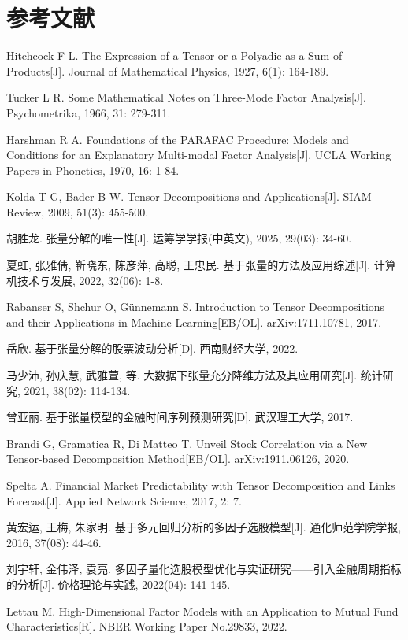 \chapter*{参考文献}
\begin{enumerate}[label={[\arabic*]}]
  \item Hitchcock F L. The Expression of a Tensor or a Polyadic as a Sum of Products[J]. Journal of Mathematical Physics, 1927, 6(1): 164-189.
  \item Tucker L R. Some Mathematical Notes on Three-Mode Factor Analysis[J]. Psychometrika, 1966, 31: 279-311.
  \item Harshman R A. Foundations of the PARAFAC Procedure: Models and Conditions for an Explanatory Multi-modal Factor Analysis[J]. UCLA Working Papers in Phonetics, 1970, 16: 1-84.
  \item Kolda T G, Bader B W. Tensor Decompositions and Applications[J]. SIAM Review, 2009, 51(3): 455-500.
  \item 胡胜龙. 张量分解的唯一性[J]. 运筹学学报(中英文), 2025, 29(03): 34-60.
  \item 夏虹, 张雅倩, 靳晓东, 陈彦萍, 高聪, 王忠民. 基于张量的方法及应用综述[J]. 计算机技术与发展, 2022, 32(06): 1-8.
  \item Rabanser S, Shchur O, Günnemann S. Introduction to Tensor Decompositions and their Applications in Machine Learning[EB/OL]. arXiv:1711.10781, 2017.
  \item 岳欣. 基于张量分解的股票波动分析[D]. 西南财经大学, 2022.
  \item 马少沛, 孙庆慧, 武雅萱, 等. 大数据下张量充分降维方法及其应用研究[J]. 统计研究, 2021, 38(02): 114-134.
  \item 曾亚丽. 基于张量模型的金融时间序列预测研究[D]. 武汉理工大学, 2017.
  \item Brandi G, Gramatica R, Di Matteo T. Unveil Stock Correlation via a New Tensor-based Decomposition Method[EB/OL]. arXiv:1911.06126, 2020.
  \item Spelta A. Financial Market Predictability with Tensor Decomposition and Links Forecast[J]. Applied Network Science, 2017, 2: 7.
  \item 黄宏运, 王梅, 朱家明. 基于多元回归分析的多因子选股模型[J]. 通化师范学院学报, 2016, 37(08): 44-46.
  \item 刘宇轩, 金伟泽, 袁亮. 多因子量化选股模型优化与实证研究——引入金融周期指标的分析[J]. 价格理论与实践, 2022(04): 141-145.
  \item Lettau M. High-Dimensional Factor Models with an Application to Mutual Fund Characteristics[R]. NBER Working Paper No.29833, 2022.

\end{enumerate}
